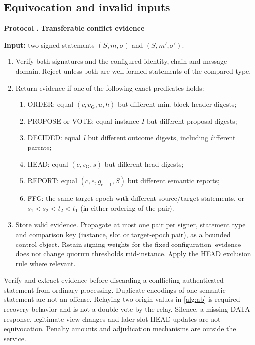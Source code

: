 \documentclass[11pt,a4paper,onecolumn]{article}
\newcommand{\gv}{v_{\mathrm G}}
\theoremstyle{remark}\newtheorem{example}[definition]{Example}
\newcounter{protocol}
\newenvironment{protocol}[2]{\refstepcounter{protocol}\label{#1}\begin{mdframed}[nobreak=true,linewidth=.6pt,skipabove=10pt,skipbelow=10pt,innertopmargin=8pt,innerbottommargin=8pt]\small\raggedright\noindent\textbf{Protocol \theprotocol. #2}\par\smallskip}{\end{mdframed}}
\begin{document}
\subsection{Equivocation and invalid inputs}\label{sec:evidence}
\begin{protocol}{alg:evidence}{Transferable conflict evidence}
\textbf{Input:} two signed statements $(S,m,\sigma)$ and $(S,m',\sigma')$.
\begin{enumerate}[label=\textbf{E\arabic*.}]
\item Verify both signatures and the configured identity, chain and message
domain. Reject unless both are well-formed statements of the compared type.
\item Return evidence if one of the following exact predicates holds:
\begin{enumerate}[label=\textnormal{(\alph*)}]
\item ORDER: equal $(c,\gv,u,h)$ but different mini-block header digests;
\item PROPOSE or VOTE: equal instance $I$ but different proposal digests;
\item DECIDED: equal $I$ but different outcome digests, including different parents;
\item HEAD: equal $(c,\gv,s)$ but different head digests;
\item REPORT: equal $(c,e,g_{e-1},S)$ but different semantic reports;
\item FFG: the same target epoch with different source/target statements, or
$s_1<s_2<t_2<t_1$ (in either ordering of the pair).
\end{enumerate}
\item Store valid evidence. Propagate at most one pair per signer, statement
type and comparison key (instance, slot or target-epoch pair), as a bounded
control object. Retain
signing weights for the fixed configuration; evidence does not change quorum
thresholds mid-instance. Apply the HEAD exclusion rule where relevant.
\end{enumerate}
\end{protocol}

Verify and extract evidence before discarding a conflicting authenticated
statement from ordinary processing. Duplicate encodings of one semantic
statement are not an offense. Relaying two origin values in \cref{alg:ab} is
required recovery behavior and is not a double vote by the relay. Silence,
a missing DATA response, legitimate view changes and later-slot HEAD updates
are not equivocation. Penalty amounts and adjudication mechanisms are outside
the service.
\end{document}

